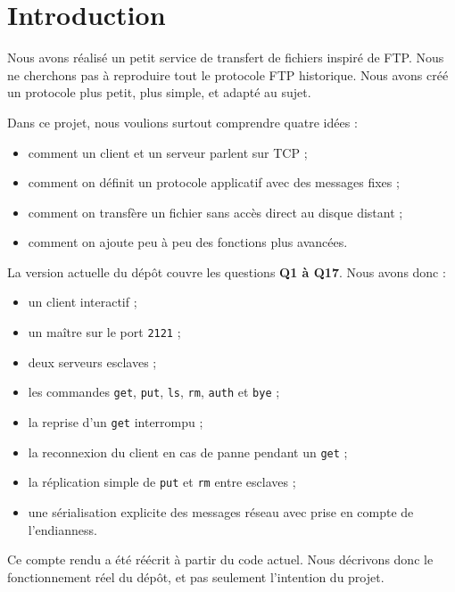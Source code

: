 \documentclass[a4paper,11pt]{article}
\begin{document}
\tableofcontents
\newpage

\section{Introduction}

Nous avons réalisé un petit service de transfert de fichiers inspiré de FTP.
Nous ne cherchons pas à reproduire tout le protocole FTP historique. Nous avons
créé un protocole plus petit, plus simple, et adapté au sujet.

Dans ce projet, nous voulions surtout comprendre quatre idées :

\begin{itemize}[leftmargin=*]
    \item comment un client et un serveur parlent sur TCP ;
    \item comment on définit un protocole applicatif avec des messages fixes ;
    \item comment on transfère un fichier sans accès direct au disque distant ;
    \item comment on ajoute peu à peu des fonctions plus avancées.
\end{itemize}

La version actuelle du dépôt couvre les questions \textbf{Q1 à Q17}. Nous avons
donc :

\begin{itemize}[leftmargin=*]
    \item un client interactif ;
    \item un maître sur le port \texttt{2121} ;
    \item deux serveurs esclaves ;
    \item les commandes \texttt{get}, \texttt{put}, \texttt{ls}, \texttt{rm},
    \texttt{auth} et \texttt{bye} ;
    \item la reprise d'un \texttt{get} interrompu ;
    \item la reconnexion du client en cas de panne pendant un \texttt{get} ;
    \item la réplication simple de \texttt{put} et \texttt{rm} entre esclaves ;
    \item une sérialisation explicite des messages réseau avec prise en compte
    de l'endianness.
\end{itemize}

\begin{infobox}
Ce compte rendu a été réécrit à partir du code actuel. Nous décrivons donc le
fonctionnement réel du dépôt, et pas seulement l'intention du projet.
\end{infobox}
\newpage
\end{document}
